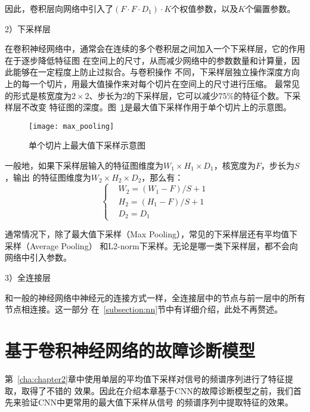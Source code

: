 因此，卷积层向网络中引入了$(F\cdot F\cdot D_1)\cdot K$个权值参数，以及$K$个偏置参数。

2）下采样层

在卷积神经网络中，通常会在连续的多个卷积层之间加入一个下采样层，它的作用在于逐步降低特征图
在空间上的尺寸，从而减少网络中的参数数量和计算量，因此能够在一定程度上防止过拟合。与卷积操作
不同，下采样层独立操作深度方向上的每一个切片，用最大值操作来对每个切片在空间上的尺寸进行压缩。
最常见的形式是核宽度为$2\times 2$、步长为2的下采样层，它可以减少75\%的特征个数。下采样层不改变
特征图的深度。图~\ref{fig:max_pooling}是最大值下采样作用于单个切片上的示意图。
\begin{figure}[ht]
  \centering%
  \texttt{[image: max\_pooling]}
  \caption{单个切片上最大值下采样示意图}
  \label{fig:max_pooling}
\end{figure}

一般地，如果下采样层输入的特征图维度为$W_1\times H_1\times D_1$，核宽度为$F$，步长为$S$，输出
的特征图维度为$W_2\times H_2\times D_2$，那么有：
\begin{equation}
  \label{equ:chap3:pool_dim}
  \left\{\begin{aligned}
    & W_2 = (W_1 - F)/S + 1 \\
    & H_2 = (H_1 - F)/S + 1 \\
    & D_2 = D_1
  \end{aligned}\right.
\end{equation}

通常情况下，除了最大值下采样（Max Pooling），常见的下采样层还有平均值下采样（Average Pooling）
和L2-norm下采样。无论是哪一类下采样层，都不会向网络中引入参数。

3）全连接层

和一般的神经网络中神经元的连接方式一样，全连接层中的节点与前一层中的所有节点相连接。这一部分
在~\ref{subsection:nn}节中有详细介绍，此处不再赘述。

\section{基于卷积神经网络的故障诊断模型}

第~\ref{cha:chapter2}章中使用单层的平均值下采样对信号的频谱序列进行了特征提取，取得了不错的
效果。因此在介绍本章基于CNN的故障诊断模型之前，我们首先来验证CNN中更常用的最大值下采样从信号
的频谱序列中提取特征的效果。

